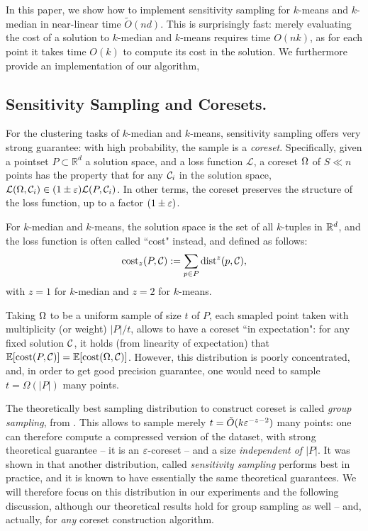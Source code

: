 In this paper, we show how to implement sensitivity sampling for $k$-means and $k$-median in near-linear time $\tilde O(nd)$.
This is surprisingly fast: merely evaluating the cost of a solution to $k$-median and $k$-means requires time $O(nk)$, as for each point it takes time $O(k)$ to compute its cost in the solution. 
We furthermore provide an implementation of our algorithm, 



\subsection{Sensitivity Sampling and Coresets.}
For the clustering tasks of $k$-median and $k$-means, sensitivity sampling offers very strong guarantee: with high probability, the sample is a \textit{coreset}.
Specifically, given a pointset $P \subset \mathbb{R}^{d}$
a solution space, and a loss function $\mathcal{L}$, a coreset $\Omega$ of $S \ll n$ points has the property that for any $\mathcal C_i$ in the solution space, $\mathcal{L}(\Omega,
\mathcal C_i) \in (1 \pm \varepsilon) \mathcal{L}(P, \mathcal C_i)$. In other terms, the coreset preserves the structure of the loss function, up to a factor $(1\pm \varepsilon)$.

For $k$-median and $k$-means, the solution space is the set of all $k$-tuples in $\mathbb{R}^d$, and the loss function is often called ``cost" instead, and defined as follows:
\[\operatorname{cost}_z(P, \mathcal C) := \sum_{p \in P} \operatorname{dist}^z(p, \mathcal C),\]
with $z=1$ for $k$-median and $z=2$ for $k$-means.

Taking $\Omega$ to be a uniform sample of size $t$ of $P$, each smapled point taken with multiplicity (or weight) $|P|/t$, allows to have a coreset ``in expectation": for any fixed solution $\mathcal C$, it holds (from linearity of expectation) that $\mathbb{E}[\operatorname{cost}(P, \mathcal C)] = \mathbb{E}[\operatorname{cost}(\Omega, \mathcal C)]$. However, this distribution is poorly concentrated, and, in order to get good precision guarantee, one would need to sample $t = \Omega(|P|)$ many points. 

The theoretically best sampling distribution to construct coreset is called \textit{group sampling}, from \cite{stoc21}. This allows to sample merely $t = \tilde O(k \varepsilon^{-z - 2})$ many points: one can therefore compute a compressed version of the dataset, with strong theoretical guarantee -- it is an $\varepsilon$-coreset -- and a size \textit{independent of $|P|$}.
It was shown in \cite{chrisESA} that another distribution, called \textit{sensitivity sampling} performs best in practice, and it is known to have essentially the same theoretical guarantees. We will therefore focus on this distribution in our experiments and the following discussion, although our theoretical results hold for group sampling as well -- and, actually, for \textit{any} coreset construction algorithm.

